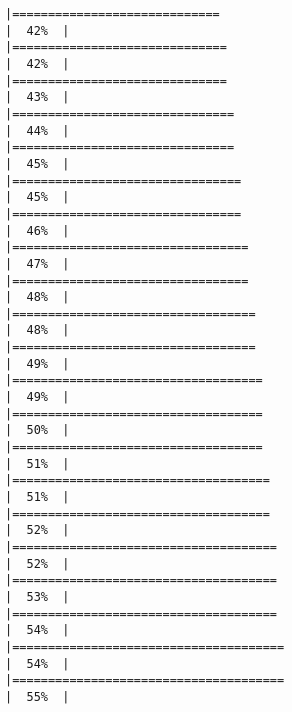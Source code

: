 \documentclass[
]{article}
\begin{document}
\begin{verbatim}
|=============================                                         |  42%  |                                                                              |==============================                                        |  42%  |                                                                              |==============================                                        |  43%  |                                                                              |===============================                                       |  44%  |                                                                              |===============================                                       |  45%  |                                                                              |================================                                      |  45%  |                                                                              |================================                                      |  46%  |                                                                              |=================================                                     |  47%  |                                                                              |=================================                                     |  48%  |                                                                              |==================================                                    |  48%  |                                                                              |==================================                                    |  49%  |                                                                              |===================================                                   |  49%  |                                                                              |===================================                                   |  50%  |                                                                              |===================================                                   |  51%  |                                                                              |====================================                                  |  51%  |                                                                              |====================================                                  |  52%  |                                                                              |=====================================                                 |  52%  |                                                                              |=====================================                                 |  53%  |                                                                              |=====================================                                 |  54%  |                                                                              |======================================                                |  54%  |                                                                              |======================================                                |  55%  |                                                                              
\end{verbatim}
\end{document}
